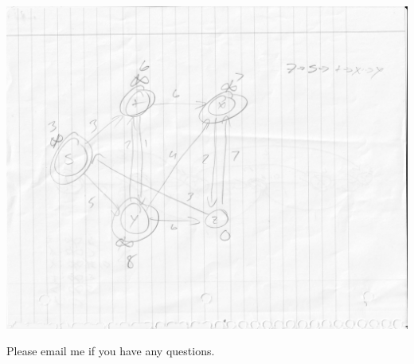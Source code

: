 \documentclass[12pt]{article}
\begin{document}
\begin{enumerate}
\includegraphics[scale=.32]{24.3-1 Vertex Z/24.3-Z.jpg}\\
\end{enumerate}
 
 
 Please email me if you have any questions.

 
\end{document}
